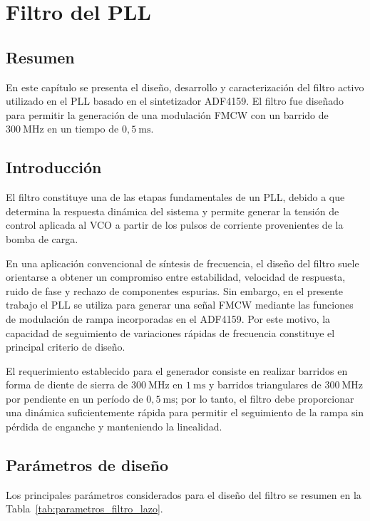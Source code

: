 \chapter{Filtro del PLL}
\section*{Resumen}

En este capítulo se presenta el diseño, desarrollo y caracterización del filtro activo utilizado en el PLL basado en el sintetizador ADF4159. El filtro fue diseñado para permitir la generación de una modulación FMCW con un barrido de $300~\mathrm{MHz}$ en un tiempo de $0{,}5~\mathrm{ms}$.

\section{Introducción}

El filtro constituye una de las etapas fundamentales de un PLL, debido a que determina la respuesta dinámica del sistema y permite generar la tensión de control aplicada al VCO a partir de los pulsos de corriente provenientes de la bomba de carga.

En una aplicación convencional de síntesis de frecuencia, el diseño del filtro suele orientarse a obtener un compromiso entre estabilidad, velocidad de respuesta, ruido de fase y rechazo de componentes espurias. Sin embargo, en el presente trabajo el PLL se utiliza para generar una señal FMCW mediante las funciones de modulación de rampa incorporadas en el ADF4159. Por este motivo, la capacidad de seguimiento de variaciones rápidas de frecuencia constituye el principal criterio de diseño.

El requerimiento establecido para el generador consiste en realizar barridos en forma de diente de sierra de $300~\mathrm{MHz}$ en $1~\mathrm{ms}$ y barridos triangulares de $300~\mathrm{MHz}$ por pendiente en un período de $0{,}5~\mathrm{ms}$; por lo tanto, el filtro debe proporcionar una dinámica suficientemente rápida para permitir el seguimiento de la rampa sin pérdida de enganche y manteniendo la linealidad.

\section{Parámetros de diseño}

Los principales parámetros considerados para el diseño del filtro se resumen en la Tabla~\ref{tab:parametros_filtro_lazo}.

